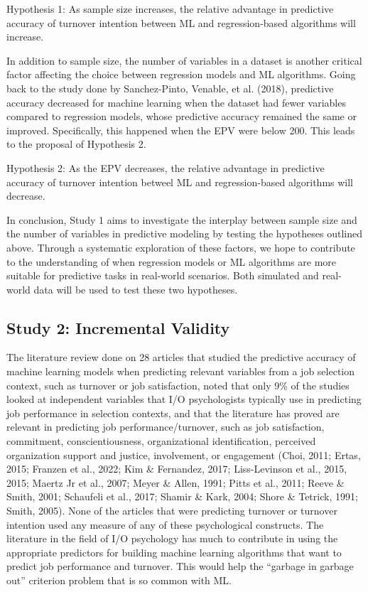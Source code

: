 \documentclass[
  jou]{apa6}
\begin{document}
Hypothesis 1: As sample size increases, the relative advantage in predictive accuracy of turnover intention between ML and regression-based algorithms will increase.

In addition to sample size, the number of variables in a dataset is another critical factor affecting the choice between regression models and ML algorithms.
Going back to the study done by Sanchez-Pinto, Venable, et al. (2018), predictive accuracy decreased for machine learning when the dataset had fewer variables compared to regression models, whose predictive accuracy remained the same or improved.
Specifically, this happened when the EPV were below 200.
This leads to the proposal of Hypothesis 2.

Hypothesis 2: As the EPV decreases, the relative advantage in predictive accuracy of turnover intention betweel ML and regression-based algorithms will decrease.

In conclusion, Study 1 aims to investigate the interplay between sample size and the number of variables in predictive modeling by testing the hypotheses outlined above.
Through a systematic exploration of these factors, we hope to contribute to the understanding of when regression models or ML algorithms are more suitable for predictive tasks in real-world scenarios.
Both simulated and real-world data will be used to test these two hypotheses.

\hypertarget{study-2-incremental-validity}{%
\subsection{Study 2: Incremental Validity}\label{study-2-incremental-validity}}

The literature review done on 28 articles that studied the predictive accuracy of machine learning models when predicting relevant variables from a job selection context, such as turnover or job satisfaction, noted that only 9\% of the studies looked at independent variables that I/O psychologists typically use in predicting job performance in selection contexts, and that the literature has proved are relevant in predicting job performance/turnover, such as job satisfaction, commitment, conscientiousness, organizational identification, perceived organization support and justice, involvement, or engagement (Choi, 2011; Ertas, 2015; Franzen et al., 2022; Kim \& Fernandez, 2017; Liss-Levinson et al., 2015, 2015; Maertz Jr et al., 2007; Meyer \& Allen, 1991; Pitts et al., 2011; Reeve \& Smith, 2001; Schaufeli et al., 2017; Shamir \& Kark, 2004; Shore \& Tetrick, 1991; Smith, 2005). None of the articles that were predicting turnover or turnover intention used any measure of any of these psychological constructs.
The literature in the field of I/O psychology has much to contribute in using the appropriate predictors for building machine learning algorithms that want to predict job performance and turnover.
This would help the ``garbage in garbage out'' criterion problem that is so common with ML.
\end{document}
